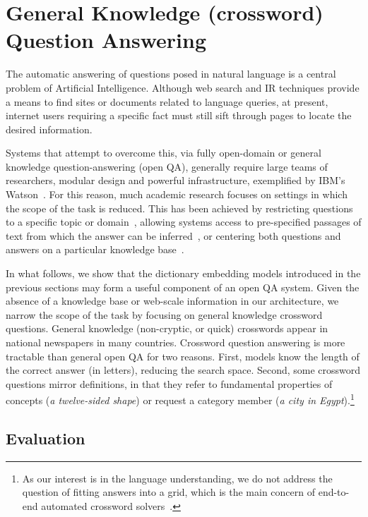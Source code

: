 \section{General Knowledge (crossword) Question Answering}

The automatic answering of questions posed in natural language is a central problem of Artificial Intelligence. Although web search and IR techniques provide a means to find sites or documents related to language queries, at present, internet users requiring a specific fact must still sift through pages to locate the desired information. 

Systems that attempt to overcome this, via fully open-domain or general knowledge question-answering (open QA), generally require large teams of researchers, modular design and powerful infrastructure, exemplified by IBM's Watson~\cite{ferrucci2010building}. For this reason, much academic research focuses on settings in which the scope of the task is reduced. This has been achieved by restricting questions to a specific topic or domain~\cite{molla2007question}, allowing systems access to pre-specified passages of text from which the answer can be inferred~\cite{Iyyer:Boyd-Graber:Claudino:Socher:Daume-2014,weston2015towards}, or centering both questions and answers on a particular knowledge base~\cite{berant14paraphrasing,bordes2014question}. 

In what follows, we show that the dictionary embedding models introduced in the previous sections may form a useful component of an open QA system. Given the absence of a knowledge base or web-scale information in our architecture, we narrow the scope of the task by focusing on general knowledge crossword questions. General knowledge (non-cryptic, or quick) crosswords appear in national newspapers in many countries. Crossword question answering is more tractable than general open QA for two reasons. First, models know the length of the correct answer (in letters), reducing the search space. Second, some crossword questions mirror definitions, in that they refer to fundamental properties of concepts (\emph{a twelve-sided shape}) or request a category member (\emph{a city in Egypt}).\footnote{As our interest is in the language understanding, we do not address the question of fitting answers into a grid, which is the main concern of end-to-end automated crossword solvers~\cite{littman2002probabilistic}.} 

\subsection{Evaluation} 

